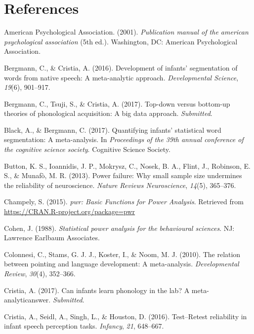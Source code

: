 \documentclass[english,floatsintext,man]{apa6}
\begin{document}
\newpage

\section{References}\label{references}

\setlength{\parindent}{-0.5in} \setlength{\leftskip}{0.5in}

\hypertarget{refs}{}
\hypertarget{ref-APA2001}{}
American Psychological Association. (2001). \emph{Publication manual of
the american psychological association} (5th ed.). Washington, DC:
American Psychological Association.

\hypertarget{ref-InWordDB}{}
Bergmann, C., \& Cristia, A. (2016). Development of infants'
segmentation of words from native speech: A meta-analytic approach.
\emph{Developmental Science}, \emph{19}(6), 901--917.

\hypertarget{ref-TopDownBottomUp}{}
Bergmann, C., Tsuji, S., \& Cristia, A. (2017). Top-down versus
bottom-up theories of phonological acquisition: A big data approach.
\emph{Submitted}.

\hypertarget{ref-InStatDB}{}
Black, A., \& Bergmann, C. (2017). Quantifying infants' statistical word
segmentation: A meta-analysis. In \emph{Proceedings of the 39th annual
conference of the cognitive science society}. Cognitive Science Society.

\hypertarget{ref-button2013power}{}
Button, K. S., Ioannidis, J. P., Mokrysz, C., Nosek, B. A., Flint, J.,
Robinson, E. S., \& Munafò, M. R. (2013). Power failure: Why small
sample size undermines the reliability of neuroscience. \emph{Nature
Reviews Neuroscience}, \emph{14}(5), 365--376.

\hypertarget{ref-pwr}{}
Champely, S. (2015). \emph{pwr: Basic Functions for Power Analysis}.
Retrieved from \url{https://CRAN.R-project.org/package=pwr}

\hypertarget{ref-cohen}{}
Cohen, J. (1988). \emph{Statistical power analysis for the behavioural
sciences}. NJ: Lawrence Earlbaum Associates.

\hypertarget{ref-PointingMA}{}
Colonnesi, C., Stams, G. J. J., Koster, I., \& Noom, M. J. (2010). The
relation between pointing and language development: A meta-analysis.
\emph{Developmental Review}, \emph{30}(4), 352--366.

\hypertarget{ref-MetaPhon}{}
Cristia, A. (2017). Can infants learn phonology in the lab? A
meta-analyticanswer. \emph{Submitted}.

\hypertarget{ref-TestRetest}{}
Cristia, A., Seidl, A., Singh, L., \& Houston, D. (2016). Test--Retest
reliability in infant speech perception tasks. \emph{Infancy},
\emph{21}, 648--667.
\end{document}
